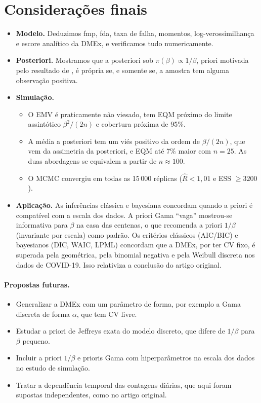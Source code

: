 \documentclass[11pt,a4paper]{article}
\begin{document}
\section{Considerações finais}

\begin{itemize}
\item \textbf{Modelo.} Deduzimos fmp, fda, taxa de falha, momentos, log-verossimilhança e escore analítico da DMEx, e verificamos tudo numericamente.
\item \textbf{Posteriori.} Mostramos que a posteriori sob $\pi(\beta)\propto1/\beta$, priori motivada pelo resultado de \cite{lindley1958}, é própria se, e somente se, a amostra tem alguma observação positiva.
\item \textbf{Simulação.}
  \begin{itemize}
  \item O EMV é praticamente não viesado, tem EQM próximo do limite assintótico $\beta^2/(2n)$ e cobertura próxima de 95\%.
  \item A média a posteriori tem um viés positivo da ordem de $\beta/(2n)$, que vem da assimetria da posteriori, e EQM até 7\% maior com $n=25$. As duas abordagens se equivalem a partir de $n\approx100$.
  \item O MCMC convergiu em todas as 15\,000 réplicas ($\hat R<1{,}01$ e ESS $\ge3200$).
  \end{itemize}
\item \textbf{Aplicação.} As inferências clássica e bayesiana concordam quando a priori é compatível com a escala dos dados. A priori Gama ``vaga'' mostrou-se informativa para $\beta$ na casa das centenas, o que recomenda a priori $1/\beta$ (invariante por escala) como padrão. Os critérios clássicos (AIC/BIC) e bayesianos (DIC, WAIC, LPML) concordam que a DMEx, por ter CV fixo, é superada pela geométrica, pela binomial negativa e pela Weibull discreta nos dados de COVID-19. Isso relativiza a conclusão do artigo original.
\end{itemize}

\paragraph{Propostas futuras.}
\begin{itemize}
\item Generalizar a DMEx com um parâmetro de forma, por exemplo a Gama discreta de forma $\alpha$, que tem CV livre.
\item Estudar a priori de Jeffreys exata do modelo discreto, que difere de $1/\beta$ para $\beta$ pequeno.
\item Incluir a priori $1/\beta$ e prioris Gama com hiperparâmetros na escala dos dados no estudo de simulação.
\item Tratar a dependência temporal das contagens diárias, que aqui foram supostas independentes, como no artigo original.
\end{itemize}
\end{document}

